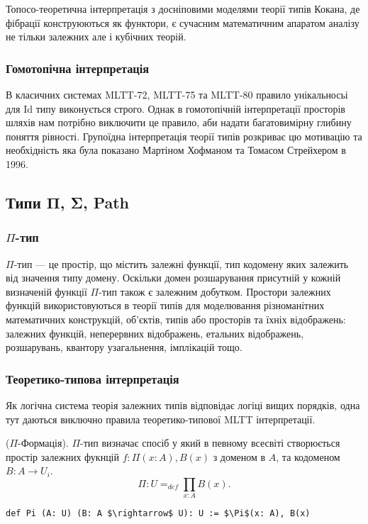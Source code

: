 Топосо-теоретична інтерпретація з досніповими моделями теорії типів Кокана,
де фібрації конструюються як функтори, є сучасним математичним апаратом
аналізу не тільки залежних але і кубічних теорій.

\subsubsection{Гомотопічна інтерпретація}
В класичних системах MLTT-72, MLTT-75 та MLTT-80 правило унікальносьі для
Id типу виконується строго. Однак в гомотопічній інтерпретації просторів шляхів
нам потрібно виключити це правило, аби надати багатовимірну глибину поняття рівності.
Групоїдна інтерпретація теорії типів розкриває цю мотивацію та необхідність яка
була показано Мартіном Хофманом та Томасом Стрейхером в 1996.

\newpage
\subsection{Типи Π, Σ, Path}

\subsubsection{$\Pi$-тип}
$\Pi$-тип --- це простір, що містить залежні функції, тип кодомену
яких залежить від значення типу домену. Оскільки домен розшарування
присутній у кожній визначеній функції $\Pi$-тип також є залежним добутком.
Простори залежних функцій використовуються в теорії типів для моделювання
різноманітних математичних конструкцій, об’єктів, типів або
просторів та їхніх відображень: залежних функцій, неперервних відображень,
етальних відображень, розшарувань, квантору узагальнення, імплікацій тощо.

\subsubsection*{Теоретико-типова інтерпретація}
Як логічна система теорія залежних типів відповідає логіці вищих порядків,
одна тут даються виключно правила теоретико-типової MLTT інтерпретації.

\begin{definition} ($\Pi$-Формація). $\Pi$-тип визначає спосіб у який
в певному всесвіті створюється простір залежних фукнцій $f: \Pi(x:A), B(x)$ з
доменом в $A$, та кодоменом $B: A \rightarrow U_i$.
$$\Pi : U =_{def} \prod_{x:A}B(x).$$
\begin{lstlisting}
def Pi (A: U) (B: A $\rightarrow$ U): U := $\Pi$(x: A), B(x)
\end{lstlisting}
\end{definition}

